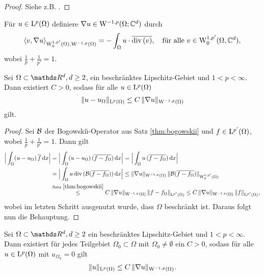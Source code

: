 \begin{proof}
  Siehe z.B. \cite[Seiten 161-172]{galdi}.
\end{proof}

Für $u \in \mathrm{L}^p(\Omega)$ definiere $\nabla u \in \mathrm{W}^{-1,p}(\Omega; \mathbb{C}^d)$ durch
$$
\langle v, \nabla u\rangle_{\mathrm{W}_0^{1,p'}(\Omega), \mathrm{W}^{-1,p}(\Omega)}
= -\int_\Omega u \cdot \overline{\mathrm{div\,} (v)}, \quad\text{für alle } v \in \mathrm{W}^{1,p'}_0(\Omega, \mathbb{C}^d),
$$
wobei $\frac{1}{p} + \frac{1}{p'} = 1$.

\begin{lem}
  \label{lem:poincare}
  Sei $\Omega \subset \R^d, d \geq 2$, ein beschränktes Lipschitz-Gebiet und $1 < p< \infty$.
  Dann existiert $C > 0$, sodass für alle $u \in \mathrm{L}^p(\Omega)$
  $$
  \| u - u_\Omega\|_{\mathrm{L}^p(\Omega)} \leq C\, \| \nabla u\|_{\mathrm{W}^{-1,p}(\Omega)}
  $$
  gilt.
\end{lem}

\begin{proof}
  Sei $\mathcal{B}$ der Bogowski\u{\i}-Operator aus Satz \ref{thm:bogowskii} und $f \in \mathrm{L}^{p'}(\Omega)$, wobei $\frac{1}{p} + \frac{1}{p'} = 1$.
  Dann gilt
  \begin{align*}
  \Big| \int_\Omega (u - u_\Omega) \, \overline f \, {\operatorname{d}\!{x}} \Big|
    &= \Big| \int_\Omega (u - u_\Omega) \, (\overline{f - f_\Omega})  \, {\operatorname{d}\!{x}} \Big|
    = \Big| \int_\Omega u \, (\overline{f - f_\Omega}) \, {\operatorname{d}\!{x}} \Big| \\
    &= \Big| \int_\Omega u \, \mathrm{div\,} ( \mathcal{B}(\overline{f - f_\Omega}) ) \, {\operatorname{d}\!{x}} \Big|
    \leq \|\nabla u\|_{\mathrm{W}^{-1,p}(\Omega)} \, \|\mathcal{B}(\overline{f - f_\Omega}) \|_{\mathrm{W}_0^{1,p'}(\Omega)} \\
    &\overset{\text{Satz } \ref{thm:bogowskii}}{\leq}  C \,  \|\nabla u\|_{\mathrm{W}^{-1,p}(\Omega)} \, \|f - f_\Omega\|_{\mathrm{L}^{p'}(\Omega)}
    \leq C \, \|\nabla u\|_{\mathrm{W}^{-1,p}(\Omega)} \, \|f\|_{\mathrm{L}^{p'}(\Omega)},
  \end{align*}
  wobei im letzten Schritt ausgenutzt wurde, dass $\Omega$ beschränkt ist.
  Daraus folgt nun die Behauptung.
\end{proof}

\begin{lem}
  \label{lem:poincare2}
  Sei $\Omega \subset \R^d, d\geq 2$ ein beschränktes Lipschitz-Gebiet und $1 < p < \infty$.
  Dann existiert für jedes Teilgebiet $\Omega_0 \subset \Omega$ mit $\Omega_0 \neq \emptyset$ ein $C > 0$, sodass für alle $u \in \mathrm{L}^p(\Omega)$ mit $u_{\Omega_0} = 0$ gilt
  $$
  \|u \|_{\mathrm{L}^p(\Omega)} \leq C \, \| \nabla u \|_{\mathrm{W}^{-1,p}(\Omega)}.
  $$
\end{lem}


